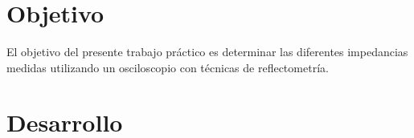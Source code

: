 \documentclass[a4paper,10pt]{article}
\title{  }
\begin{document}
	\maketitle %
	\newpage

	\tableofcontents %
	\newpage


	\section{Objetivo}
	
	\indent	El objetivo del presente trabajo práctico es determinar las 
	diferentes impedancias medidas utilizando un osciloscopio con técnicas de 
	reflectometría.
	
	\newpage
	\section{Desarrollo}
\end{document}
